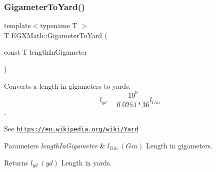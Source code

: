 \subsubsection{\texorpdfstring{Gigameter\+To\+Yard()}{GigameterToYard()}}
{\footnotesize\ttfamily template$<$typename T $>$ \\
T E\+G\+X\+Math\+::\+Gigameter\+To\+Yard (\begin{DoxyParamCaption}\item[{const T}]{length\+In\+Gigameter }\end{DoxyParamCaption})}



Converts a length in gigameters to yards. \[ l_{yd}= \frac{10^{9}}{0.0254 * 36} l_{Gm} \]. 

See \href{https://en.wikipedia.org/wiki/Yard}{\tt https\+://en.\+wikipedia.\+org/wiki/\+Yard} 
\begin{DoxyParams}{Parameters}
{\em length\+In\+Gigameter} & $ l_{Gm}\ (Gm)$ Length in gigameters. \\
\hline
\end{DoxyParams}
\begin{DoxyReturn}{Returns}
$ l_{yd}\ (yd)$ Length in yards. 
\end{DoxyReturn}
